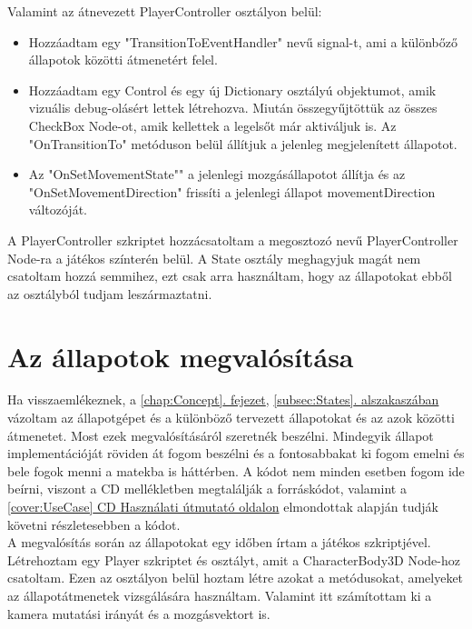 Valamint az átnevezett PlayerController osztályon belül:
\begin{itemize}
	\item Hozzáadtam egy "TransitionToEventHandler" nevű signal-t, ami a külön\-bőző állapotok közötti átmenetért felel.
	\item Hozzáadtam egy Control és egy új Dictionary osztályú objektumot, amik vizuális debug-olásért lettek létrehozva. Miután összegyűjtöttük az összes CheckBox Node-ot, amik kellettek a legelsőt már aktiváljuk is. Az "OnTransitionTo" metóduson belül állítjuk a jelenleg megjelenített állapotot.
	\item Az "OnSetMovementState"" a jelenlegi mozgásállapotot állítja és az "OnSetMovementDirection" frissíti a jelenlegi állapot movementDirection változóját.
\end{itemize}

A PlayerController szkriptet hozzácsatoltam a megosztozó nevű PlayerController Node-ra a játékos színterén belül. A State osztály meghagyjuk magát nem csatoltam hozzá semmihez, ezt csak arra használtam, hogy az állapotokat ebből az osztályból tudjam leszármaztatni.

\section[Állapotok]{Az állapotok megvalósítása}

Ha visszaemlékeznek, a \hyperref[chap:Concept]{\ref{chap:Concept}. fejezet}, \hyperref[subsec:States]{\ref{subsec:States}. alszakaszában} vázoltam az állapotgé\-pet és a különböző tervezett állapotokat és az azok közötti átmenetet. Most ezek megvalósításáról szeretnék beszélni.
Mindegyik állapot implementációját röviden át fogom beszélni és a fontosabbakat ki fogom emelni és bele fogok menni a matekba is háttérben. A kódot nem minden esetben fogom ide beírni, viszont a CD mellékletben megtalálják a forráskódot, valamint a \hyperref[cover:UseCase]{\ref{cover:UseCase} CD Használati útmutató oldalon} elmondottak alapján tudják követni részletesebben a kódot.\\

A megvalósítás során az állapotokat egy időben írtam a játékos szkriptjével. Létrehoztam egy Player szkriptet és osztályt, amit a CharacterBody3D Node-hoz csatoltam. Ezen az osztályon belül hoztam létre azokat a metódusokat, amelyeket az állapotátmenetek vizsgálására használtam. Vala\-mint itt számítottam ki a kamera mutatási irányát és a mozgásvektort is.\\

